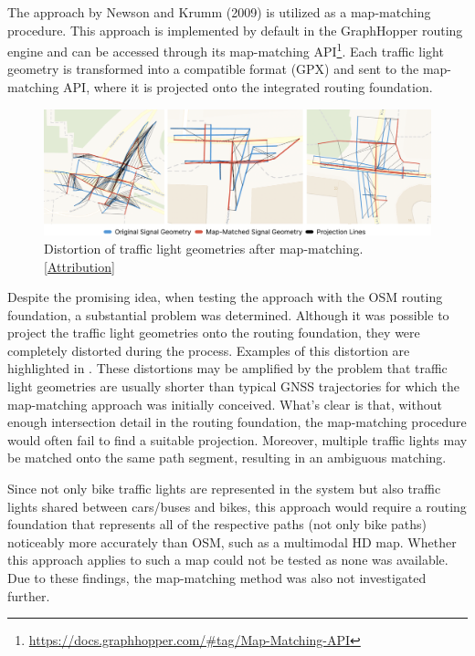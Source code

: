 The approach by Newson and Krumm (2009) \cite{newson_hidden_2009} is utilized as a map-matching procedure. This approach is implemented by default in the GraphHopper routing engine and can be accessed through its map-matching API\footnote{\url{https://docs.graphhopper.com/\#tag/Map-Matching-API}}. Each traffic light geometry is transformed into a compatible format (GPX) and sent to the map-matching API, where it is projected onto the integrated routing foundation.

\begin{figure}[htbp]
\centering
\includegraphics[width=\linewidth]{images/sg-selection-map-matching-fails.png}
\caption{Distortion of traffic light geometries after map-matching. [\hyperref[attribution]{Attribution}]}
\label{fig:sg-selection-map-matching-fails}
\end{figure}

Despite the promising idea, when testing the approach with the OSM routing foundation, a substantial problem was determined. Although it was possible to project the traffic light geometries onto the routing foundation, they were completely distorted during the process. Examples of this distortion are highlighted in . These distortions may be amplified by the problem that traffic light geometries are usually shorter than typical GNSS trajectories for which the map-matching approach was initially conceived. What's clear is that, without enough intersection detail in the routing foundation, the map-matching procedure would often fail to find a suitable projection. Moreover, multiple traffic lights may be matched onto the same path segment, resulting in an ambiguous matching. 

Since not only bike traffic lights are represented in the system but also traffic lights shared between cars/buses and bikes, this approach would require a routing foundation that represents all of the respective paths (not only bike paths) noticeably more accurately than OSM, such as a multimodal HD map. Whether this approach applies to such a map could not be tested as none was available. Due to these findings, the map-matching method was also not investigated further.

